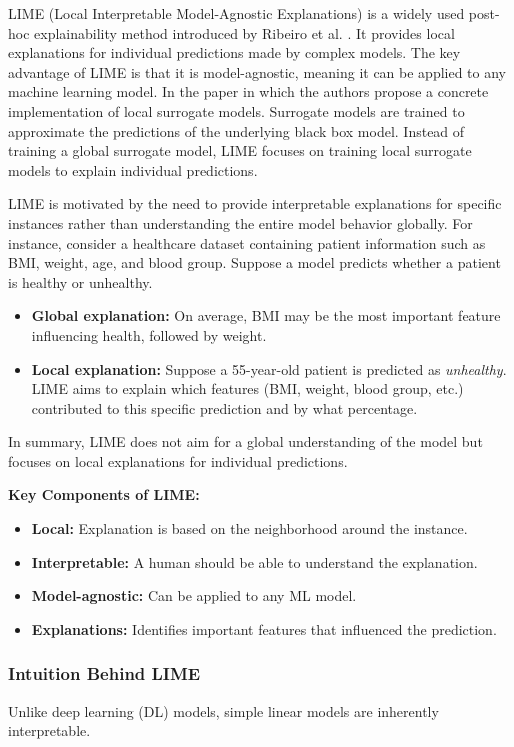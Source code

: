 LIME (Local Interpretable Model-Agnostic Explanations) is a widely used post-hoc explainability method introduced by Ribeiro et al. \cite{Ribeiro2018}. It provides local explanations for individual predictions made by complex models. The key advantage of LIME is that it is model-agnostic, meaning it can be applied to any machine learning model. In the paper \cite{ribeiro2016ML} in which the authors propose a concrete implementation of local surrogate models. Surrogate models are trained to approximate the predictions of the underlying black box model. Instead of training a global surrogate model, LIME focuses on training local surrogate models to explain individual predictions.

LIME is motivated by the need to provide interpretable explanations for specific instances rather than understanding the entire model behavior globally. For instance, consider a healthcare dataset containing patient information such as BMI, weight, age, and blood group. Suppose a model predicts whether a patient is healthy or unhealthy. 

\begin{itemize}
    \item \textbf{Global explanation:} On average, BMI may be the most important feature influencing health, followed by weight.
    \item \textbf{Local explanation:} Suppose a 55-year-old patient is predicted as \textit{unhealthy}. LIME aims to explain which features (BMI, weight, blood group, etc.) contributed to this specific prediction and by what percentage.
\end{itemize}

In summary, LIME does not aim for a global understanding of the model but focuses on local explanations for individual predictions.

\textbf{Key Components of LIME:}
\begin{itemize}
    \item \textbf{Local:} Explanation is based on the neighborhood around the instance.
    \item \textbf{Interpretable:} A human should be able to understand the explanation.
    \item \textbf{Model-agnostic:} Can be applied to any ML model.
    \item \textbf{Explanations:} Identifies important features that influenced the prediction.
\end{itemize}

\subsubsection{Intuition Behind LIME}
Unlike deep learning (DL) models, simple linear models are inherently interpretable. 

